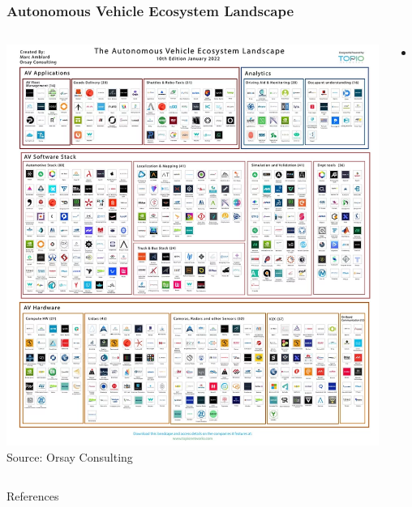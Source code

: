 \documentclass[aspectratio=169]{beamer}
\begin{document}
\begin{frame}
\frametitle{Autonomous Vehicle Ecosystem Landscape}
\begin{columns}[]
    \begin{column}{0.4\textwidth}
        \centering
        \includegraphics[height=0.75\textheight]{images/av_ecosystem_landscape.png}\\
        \footnotesize{Source: Orsay Consulting\footnotemark[1]}        
    \end{column}
    \begin{column}{0.6\textwidth}
        \begin{itemize}
            \item aaa
        \end{itemize}
    \end{column}
\end{columns}
\end{frame}

\begin{frame}[allowframebreaks]{References}
\printbibliography
\end{frame}
\end{document}
